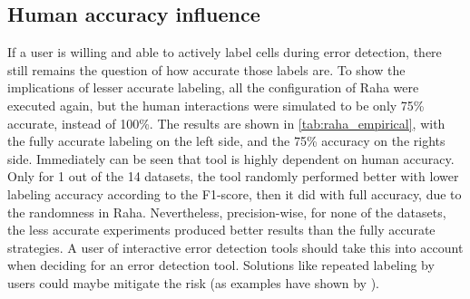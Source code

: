 
\subsection{Human accuracy influence}
If a user is willing and able to actively label cells during error detection, there still remains the question of how accurate those labels are. To show the implications of lesser accurate labeling, all the configuration of Raha were executed again, but the human interactions were simulated to be only 75\% accurate, instead of 100\%. The results are shown in \autoref{tab:raha_empirical}, with the fully accurate labeling on the left side, and the 75\% accuracy on the rights side. Immediately can be seen that tool is highly dependent on human accuracy. Only for 1 out of the 14 datasets, the tool randomly performed better with lower labeling accuracy according to the F1-score, then it did with full accuracy, due to the randomness in Raha. Nevertheless, precision-wise, for none of the datasets, the less accurate experiments produced better results than the fully accurate strategies. A user of interactive error detection tools should take this into account when deciding for an error detection tool. Solutions like repeated labeling by users could maybe mitigate the risk (as examples have shown by \cite{Sheng2008-gk}).

